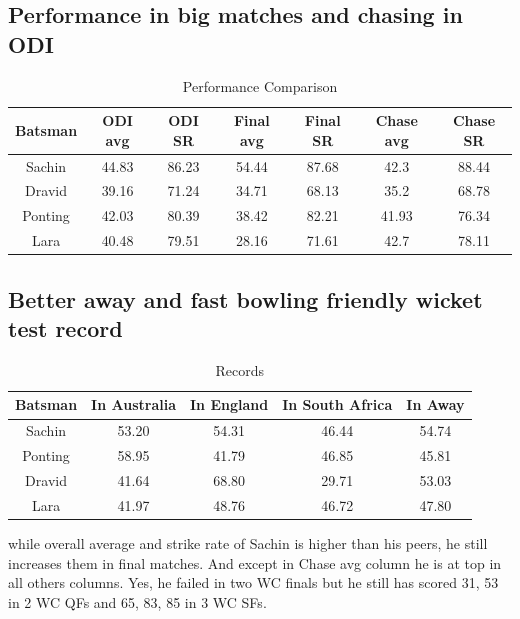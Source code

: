 \documentclass[12pt,twocolumn ]{article}
\begin{document}
\subsection{Performance in big matches and chasing in ODI}
\begin{table}[h]
    \centering
    \begin{tabular}{|c|c|c|c|c|c|c|}
\hline
   
Batsman & ODI avg & ODI SR & Final avg & Final SR & Chase avg & Chase SR\\
\hline     
Sachin & 44.83 & 86.23 & 54.44 & 87.68 & 42.3 & 88.44\\
\hline
Dravid  & 39.16 & 71.24 & 34.71  & 68.13 & 35.2 & 68.78\\
\hline
Ponting & 42.03 &  80.39 & 38.42 & 82.21  & 41.93 &  76.34\\
\hline
Lara & 40.48 & 79.51 & 28.16 & 71.61 & 42.7 & 78.11\\
\hline
\end{tabular}
    \caption{Performance Comparison}
    \label{tab:my_label}
\end{table}
\subsection{Better away and fast bowling friendly wicket test record}
\begin{table}[h]
    \centering
    \begin{tabular}{|c|c|c|c|c|}
     \hline
     Batsman & In Australia & In England & In South Africa & In Away  \\
     \hline
     Sachin  & 53.20 & 54.31 & 46.44 & 54.74 \\
     \hline
     Ponting & 58.95 & 41.79 & 46.85 & 45.81\\
     \hline
     Dravid & 41.64 & 68.80 & 29.71 & 53.03\\
     \hline
     Lara & 41.97 & 48.76 & 46.72 & 47.80\\
     \hline
\end{tabular}
    \caption{Records}
    \label{tab:my_label}
\end{table}
\par  while overall average and strike rate of Sachin is higher than his peers, he still increases them in final matches. And except in Chase avg column he is at top in all others columns. Yes, he failed in two WC finals but he still has scored 31, 53 in 2 WC QFs and 65, 83, 85 in 3 WC SFs\cite{espn}.
\end{document}
